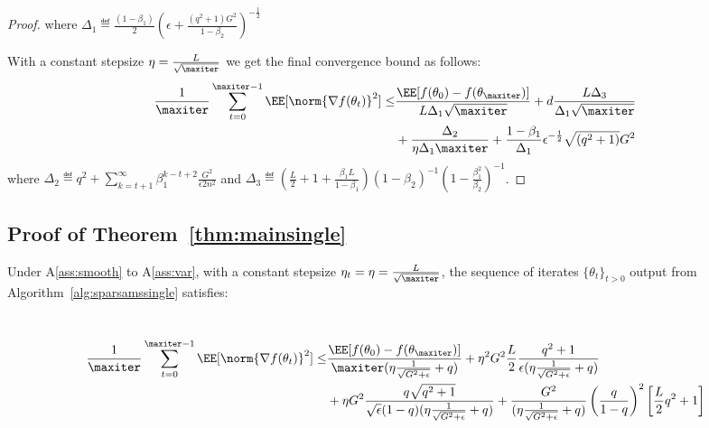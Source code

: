 \documentclass[11pt]{article}
\begin{document}
\begin{proof}
where $\Delta_1 \eqdef \frac{(1-\beta_1)}{2} (\epsilon + \frac{(q^2+1)G^2}{1 - \beta_2})^{-\frac{1}{2}}$

With a constant stepsize $\eta = \frac{L}{\sqrt{\maxiter}}$ we get the final convergence bound as follows:
\begin{equation}
\begin{split}
 \frac{1}{\maxiter}\sum_{t=0}^{\maxiter -1} \EE[\norm{\nabla f(\theta_t)}^2] \leq & \frac{\EE[ f(\theta_{0}) - f(\theta_{\maxiter})]}{L \Delta_1 \sqrt{\maxiter}} + 
d\frac{L \Delta_3}{\Delta_1 \sqrt{\maxiter}} \\
& + \frac{\Delta_2}{\eta \Delta_1\maxiter} +\frac{1-\beta_1}{\Delta_1}  \epsilon^{-\frac{1}{2}} \sqrt{(q^2+1)}G^2 
\end{split}
\end{equation}
where $\Delta_2 \eqdef q^2 + \sum_{k=t+1}^\infty  \beta_1^{k-t+2}\frac{G^2 }{\epsilon 2n^2}$ and $\Delta_3 \eqdef \left(\frac{L}{2} + 1+ \frac{\beta_1L}{1-\beta_1} \right) (1-\beta_2)^{-1} (1 - \frac{\beta_1^{2}}{\beta_2})^{-1}$.


\end{proof}


\subsection{Proof of Theorem~\ref{thm:mainsingle}}
\begin{Theorem}\label{thm:mainsingle}
Under A\ref{ass:smooth} to A\ref{ass:var}, with a constant stepsize $\eta_t = \eta = \frac{L}{\sqrt{\maxiter}}$, the sequence of iterates $\{\theta_t\}_{t>0}$ output from Algorithm~\ref{alg:sparsamssingle} satisfies:

\ \begin{align}
 \frac{1}{\maxiter}\sum_{t=0}^{\maxiter -1} \EE[\norm{\nabla f(\theta_t)}^2]  \leq &
 \frac{\EE[f(\theta_{0}) - f(\theta_{\maxiter})]}{\maxiter(\eta\frac{1}{\sqrt{G^2+\epsilon}} + q )} + \eta^2 G^2\frac{L}{2} \frac{q^2+1}{\epsilon(\eta\frac{1}{\sqrt{G^2+\epsilon}} + q)} \\
 & + \eta G^2 \frac{q\sqrt{q^2+1}}{\sqrt{\epsilon}(1-q)(\eta\frac{1}{\sqrt{G^2+\epsilon}} + q)}  +  \frac{G^2}{(\eta\frac{1}{\sqrt{G^2+\epsilon}} + q)} \left(\frac{q}{1-q}\right)^2 \left[ \frac{L}{2}q^2 + 1 \right]
  \end{align}
\end{Theorem}
\end{document}
